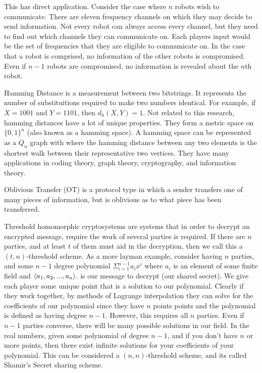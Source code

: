 \documentclass[10pt]{article}
\begin{document}
This has direct application. Consider the case where $n$ robots wish to communicate. There are eleven frequency channels on which they may decide to send information. Not every robot can always access every channel, but they need to find out which channels they can communicate on. Each players input would be the set of frequencies that they are eligible to communicate on. In the case that a robot is comprised, no information of the other robots is compromised. Even if $n-1$ robots are compromised, no information is revealed about the $n$th robot.

Hamming Distance is a measurement between two bitstrings. It represents the number of substituitions required to make two numbers identical. For example, if $X = 1001$ and $Y = 1101$, then $d_h(X,Y) = 1$. Not related to this research, hamming distances have a lot of unique properties. They form a metric space on $\{0,1\}^n$ (also known as a hamming space). A hamming space can be represented as a $Q_n$ graph with where the hamming distance between any two elements is the shortest walk between their representative two vertices. They have many applications in coding theory, graph theory, cryptography, and information theory.

Oblivious Transfer (OT) is a protocol type in which a sender transfers one of many pieces of information, but is oblivious as to what piece has been transferred.

Threshold homomorphic cryptosystems are systems that in order to decrypt an encrypted message, require the work of several parties is required. If there are $n$ parties, and at least $t$ of them must aid in the decryption, then we call this a $(t,n)$-threshold scheme. As a more layman example, consider having $n$ parties, and some $n-1$ degree polynomial $\Sigma_{i=1}^{n-1} a_i x^i$ where $a_i$ is an element of some finite field and $\braket{a_1,a_2,...,a_n}$. is our message to decrypt (our shared secret). We give each player some unique point that is a solution to  our polynomial. Clearly if they work together, by methods of Lagrange interpolation they can solve for the coefficients of our polynomial since they have $n$ points points and the polynomial is defined as having degree $n-1$. However, this requires all $n$ parties. Even if $n-1$ parties converse, there will be many possible solutions in our field. In the real numbers, given some polynomial of degree $n-1$, and if you don't have $n$ or more points, then there exist infinite solutions for your coefficients of your polynomial. This can be considered a $(n,n)$-threshold scheme, and its called Shamir's Secret sharing scheme.\cite{shamir}
\end{document}
